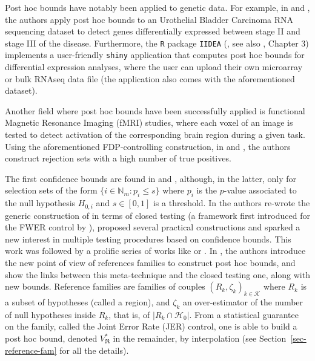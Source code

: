 \documentclass[
  11pt,
  a4paper,
]{article}
\theoremstyle{plain}
\theoremstyle{definition}
\theoremstyle{plain}
\theoremstyle{definition}
\theoremstyle{plain}
\theoremstyle{remark}
\begin{document}
Post hoc bounds have notably been applied to genetic data. For example,
in \citet{MR2951390} and \citet{10.1093/bioinformatics/btac693}, the
authors apply post hoc bounds to an Urothelial Bladder Carcinoma RNA
sequencing dataset to detect genes differentially expressed between
stage II and stage III of the disease. Furthermore, the \texttt{R}
\citep{R-base} package \texttt{IIDEA} (\citet{IIDEA}, see also
\citet{enjalbertcourrech:tel-05034928}, Chapter 3) implements a
user-friendly \texttt{shiny} application \citep{shiny} that computes
post hoc bounds for differential expression analyses, where the user can
upload their own microarray or bulk RNAseq data file (the application
also comes with the aforementioned dataset).

Another field where post hoc bounds have been successfully applied is
functional Magnetic Resonance Imaging (fMRI) studies, where each voxel
of an image is tested to detect activation of the corresponding brain
region during a given task. Using the aforementioned FDP-controlling
construction, in \citet{blain22notip} and \citet{NEURIPS2023_f6712d51},
the authors construct rejection sets with a high number of true
positives.

The first confidence bounds are found in \citet{MR2279468} and
\citet{MR2279639}, although, in the latter, only for selection sets of
the form \(\{i\in\mathbb{N}_m: p_i\leq s\}\) where \(p_i\) is the
\(p\)-value associated to the null hypothesis \(H_{0,i}\) and
\(s\in[0,1]\) is a threshold. In \citet{MR2951390} the authors re-wrote
the generic construction of \citet{MR2279468} in terms of closed testing
(a framework first introduced for the FWER control by \citet{MR468056}),
proposed several practical constructions and sparked a new interest in
multiple testing procedures based on confidence bounds. This work was
followed by a prolific series of works like \citet{MR3305943} or
\citet{MR4731977}. In \citet{MR4124323}, the authors introduce the new
point of view of references families to construct post hoc bounds, and
show the links between this meta-technique and the closed testing one,
along with new bounds. Reference families are families of couples
\((R_k,\zeta_k)_{k\in\mathcal{K}}\) where \(R_k\) is a subset of
hypotheses (called a region), and \(\zeta_k\) an over-estimator of the
number of null hypotheses inside \(R_k\), that is, of
\(|R_k\cap\mathcal{H}_0|\). From a statistical guarantee on the family,
called the Joint Error Rate (JER) control, one is able to build a post
hoc bound, denoted \(V^*_{\mathfrak{R}}\) in the remainder, by
interpolation (see Section~\ref{sec-reference-fam} for all the details).
\end{document}
